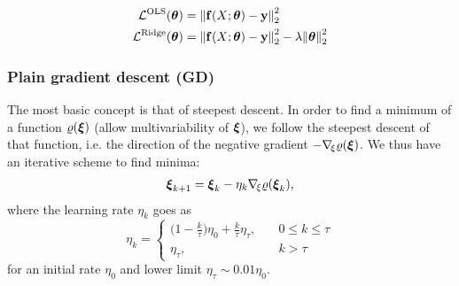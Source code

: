 
    \begin{subequations}\label{eq:linear_regression_cost_functions}
        \begin{align}
            \mathcal{L}^\mathrm{OLS}(\boldsymbol{\theta}) &=  \norm{\mathbf{f}(X; \boldsymbol{\theta} ) - \mathbf{y}}_2^2 \label{eq:ols_cost_function}\\
            \mathcal{L}^\mathrm{Ridge}(\boldsymbol{\theta})&=\norm{\mathbf{f}(X; \boldsymbol{\theta} ) - \mathbf{y}}_2^2  -  \lambda\norm{\boldsymbol{\theta}}_2^2 \label{eq:ridge_cost_function}
        \end{align}
    \end{subequations}

 
    \subsubsection{Plain gradient descent (GD)}\label{sec:plain_gradient_descent}
        The most basic concept is that of steepest descent. In order to find a minimum of a function $\varrho(\boldsymbol{\xi})$ (allow multivariability of $\boldsymbol{\xi}$), we follow the steepest descent of that function, i.e. the direction of the negative gradient $-\nabla_{\!\xi} \varrho(\boldsymbol{\xi})$. We thus have an iterative scheme to find minima:
        \begin{align}\label{eq:steepest_descent}
            \boldsymbol{\xi}_{k+1} = \boldsymbol{\xi}_k - \eta_k\nabla_{\!\xi} \varrho(\boldsymbol{\xi}_k),
        \end{align}
        where the learning rate $\eta_k$ goes as
        \begin{equation}\label{eq:learning_schedule}
            \eta_k = \begin{cases}
                \big(1-\frac{k}{\tau}\big)\eta_0 + \frac{k}{\tau}\eta_\tau,\quad & 0 \leq k \leq \tau \\
                \eta_\tau, & k>\tau
            \end{cases}
        \end{equation}
        for an initial rate $\eta_0$ and lower limit $\eta_\tau \sim 0.01 \eta_0$.

